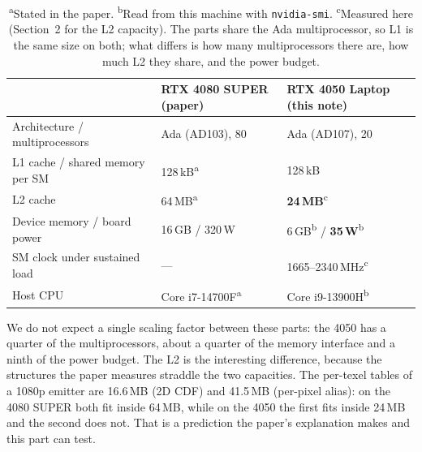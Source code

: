 \documentclass[10pt]{article}
\begin{document}
\begin{table}[H]
\centering\small
\begin{tabular}{lll}
\toprule
& RTX 4080 SUPER (paper) & RTX 4050 Laptop (this note) \\
\midrule
Architecture / multiprocessors & Ada (AD103), 80 & Ada (AD107), 20 \\
L1 cache / shared memory per SM & 128\,kB\textsuperscript{a} & 128\,kB \\
L2 cache & 64\,MB\textsuperscript{a} & \textbf{24\,MB}\textsuperscript{c} \\
Device memory / board power & 16\,GB / 320\,W & 6\,GB\textsuperscript{b} / \textbf{35\,W}\textsuperscript{b} \\
SM clock under sustained load & --- & 1665--2340\,MHz\textsuperscript{c} \\
Host CPU & Core i7-14700F\textsuperscript{a} & Core i9-13900H\textsuperscript{b} \\
\bottomrule
\end{tabular}
\caption{\textsuperscript{a}Stated in the paper. \textsuperscript{b}Read from this machine with
\texttt{nvidia-smi}. \textsuperscript{c}Measured here (Section~2 for the L2 capacity). The parts
share the Ada multiprocessor, so L1 is the same size on both; what differs is how many
multiprocessors there are, how much L2 they share, and the power budget.}
\label{tab:gpus}
\end{table}

We do not expect a single scaling factor between these parts: the 4050 has a quarter of the
multiprocessors, about a quarter of the memory interface and a ninth of the power budget. The L2 is
the interesting difference, because the structures the paper measures straddle the two capacities.
The per-texel tables of a 1080p emitter are 16.6\,MB (2D CDF) and 41.5\,MB (per-pixel alias): on the
4080 SUPER both fit inside 64\,MB, while on the 4050 the first fits inside 24\,MB and the second does
not. That is a prediction the paper's explanation makes and this part can test.
\end{document}
